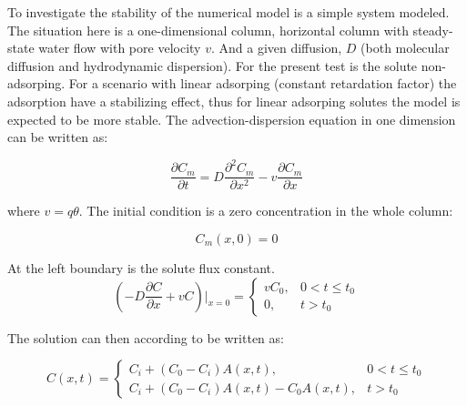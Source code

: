 \documentclass{report}
\newcommand{\erfc}{\operatorname{erfc}}                 %
\begin{document}
To investigate the stability of the numerical model is a simple system
 modeled. The situation here is a one-dimensional column, horizontal
 column with steady-state water flow with pore velocity $v$. And a given
diffusion, $D$ (both molecular diffusion and hydrodynamic
dispersion). For the present test is the solute non-adsorping. For a
scenario with linear adsorping (constant retardation factor) the
adsorption have a stabilizing effect, thus for linear adsorping solutes
the model is expected to be more stable. The advection-dispersion
equation in one dimension can be written as:

\begin{equation}
\frac{\partial C_m}{\partial t}=D\frac{\partial^2C_m}{\partial
  x^2}-v\frac{\partial C_m}{\partial x}
\end{equation}

where $v=q\theta$. The initial condition is a zero concentration in
the whole column:

\begin{equation}
C_m(x,0)=0
\end{equation}


At the left boundary is the solute flux constant.
%
\begin{equation}
\left(-D\frac{\partial C}{\partial
x}+vC\right)\bigg\vert_{x=0}=\begin{cases} vC_0, &
 0<t\leq t_0 \\ 0, & t>t_0 \end{cases}
\end{equation}


The solution can then according to \cite{Genuchtenanalytical} be
written as:


\begin{equation}
C(x,t)=\begin{cases}C_i+(C_0-C_i)A(x,t), & 0<t\leq t_0 \\
  C_i+(C_0-C_i)A(x,t)-C_0A(x,t), & t>t_0 \end{cases}
\end{equation}

\end{document}
